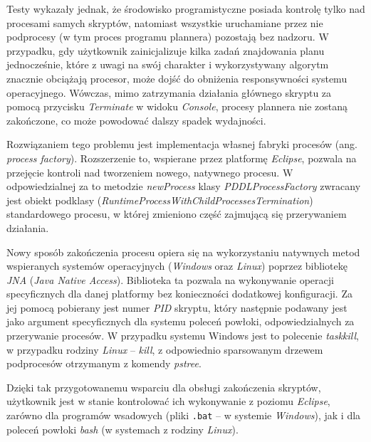 Testy wykazały jednak, że środowisko programistyczne posiada kontrolę tylko nad procesami samych skryptów, natomiast wszystkie uruchamiane przez nie podprocesy (w tym proces programu plannera) pozostają bez nadzoru. W przypadku, gdy użytkownik zainicjalizuje kilka zadań znajdowania planu jednocześnie, które z uwagi na swój charakter i wykorzystywany algorytm znacznie obciążają procesor, może dojść do obniżenia responsywności systemu operacyjnego. Wówczas, mimo zatrzymania działania głównego skryptu za pomocą przycisku \textit{Terminate} w widoku \textit{Console}, procesy plannera nie zostaną zakończone, co może powodować dalszy spadek wydajności.

Rozwiązaniem tego problemu jest implementacja własnej fabryki procesów (ang. \textit{process factory}). Rozszerzenie to, wspierane przez platformę \textit{Eclipse}, pozwala na przejęcie kontroli nad tworzeniem nowego, natywnego procesu. W odpowiedzialnej za to metodzie \textit{newProcess} klasy \textit{PDDLProcessFactory} zwracany jest obiekt podklasy (\textit{RuntimeProcessWithChildProcessesTermination}) standardowego procesu, w której zmieniono część zajmującą się przerywaniem działania.

Nowy sposób zakończenia procesu opiera się na wykorzystaniu natywnych metod wspieranych systemów operacyjnych (\textit{Windows} oraz \textit{Linux}) poprzez bibliotekę \textit{JNA} (\textit{Java Native Access}). Biblioteka ta pozwala na wykonywanie operacji specyficznych dla danej platformy bez konieczności dodatkowej konfiguracji. Za jej pomocą pobierany jest numer \textit{PID} skryptu, który następnie podawany jest jako argument specyficznych dla systemu poleceń powłoki, odpowiedzialnych za przerywanie procesów. W przypadku systemu Windows jest to polecenie \textit{taskkill}, w przypadku rodziny \textit{Linux} -- \textit{kill}, z odpowiednio sparsowanym drzewem podprocesów otrzymanym z komendy \textit{pstree}.

Dzięki tak przygotowanemu wsparciu dla obsługi zakończenia skryptów, użytkownik jest w stanie kontrolować ich wykonywanie z poziomu \textit{Eclipse}, zarówno dla programów wsadowych (pliki \texttt{.bat} -- w systemie \textit{Windows}), jak i dla poleceń powłoki \textit{bash} (w systemach z rodziny \textit{Linux}).
